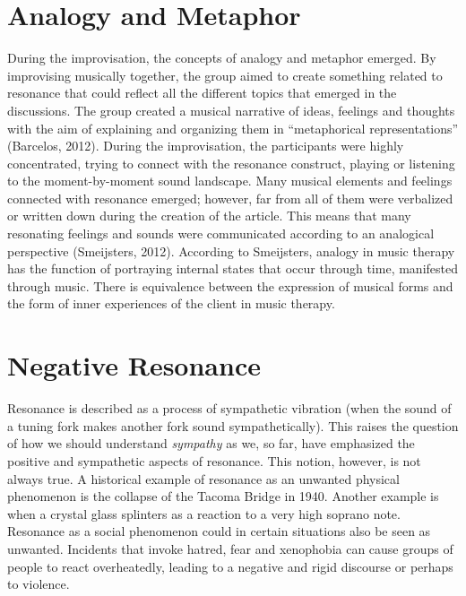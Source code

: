 \begin{adjmulticols}{2}{0mm}{0mm}
\section{Analogy and Metaphor}
During the improvisation, the concepts of analogy and metaphor emerged. By improvising musically together, the group aimed to create something related to resonance that could reflect all the different topics that emerged in the discussions. The group created a musical narrative of ideas, feelings and thoughts with the aim of explaining and organizing them in \enquote{metaphorical representations} (Barcelos, 2012). During the improvisation, the participants were highly concentrated, trying to connect with the resonance construct, playing or listening to the moment-by-moment sound landscape. Many musical elements and feelings connected with resonance emerged; however, far from all of them were verbalized or written down during the creation of the article. This means that many resonating feelings and sounds were communicated according to an analogical perspective (Smeijsters, 2012). According to Smeijsters, analogy in music therapy has the function of portraying internal states that occur through time, manifested through music. There is equivalence between the expression of musical forms and the form of inner experiences of the client in music therapy. 

\section{Negative Resonance}
Resonance is described as a process of sympathetic vibration (when the sound of a tuning fork makes another fork sound sympathetically). This raises the question of how we should understand \textit{sympathy} as we, so far, have emphasized the positive and sympathetic aspects of resonance. This notion, however, is not always true. A historical example of resonance as an unwanted physical phenomenon is the collapse of the Tacoma Bridge in 1940. Another example is when a crystal glass splinters as a reaction to a very high soprano note. Resonance as a social phenomenon could in certain situations also be seen as unwanted. Incidents that invoke hatred, fear and xenophobia can cause groups of people to react overheatedly, leading to a negative and rigid discourse or perhaps to violence.


\end{adjmulticols}
